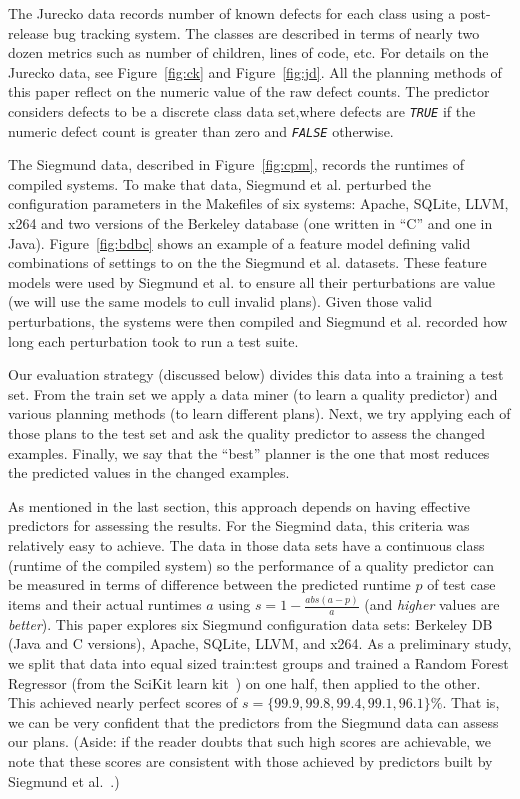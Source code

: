 \documentclass{sig-alternate}
\newcommand{\fig}[1]{Figure~\ref{fig:#1}}
\begin{document}
  
   The Jurecko data records number of known defects for each class using a post-release bug tracking system. The classes are described in terms of
  nearly two dozen metrics such as number of children, lines of code, etc. For details on the Jurecko data, see  \fig{ck} and \fig{jd}. 
 All the planning methods of this paper reflect on the numeric value of the raw defect counts. The predictor considers defects to be a discrete class data set,where defects are \textit{\texttt{TRUE}} if the numeric defect count is greater than zero and \textit{\texttt{FALSE}} otherwise.

  The Siegmund data, described in \fig{cpm},  records  the runtimes of compiled systems. To make that data, Siegmund et al. perturbed
  the configuration parameters in the Makefiles of six systems: Apache, SQLite, LLVM, x264 and two versions of the
  Berkeley database (one written in ``C'' and one in Java). 
   \fig{bdbc} shows an example of a feature model defining valid combinations of settings to on the
   the Siegmund et al. datasets. These feature models were used by Siegmund et al. to ensure all their perturbations are value
   (we will use the same models to cull invalid plans).
  Given those valid perturbations, the systems were then compiled and 
  Siegmund et al. recorded how long each perturbation took to run a test suite. 
  
  


  Our evaluation strategy (discussed below) divides this data into a training a test set.
  From the train set we apply a data miner (to learn a quality predictor) and
  various planning methods (to learn different plans). Next, we try applying
  each of those plans to the  test set and ask the quality predictor to assess the changed examples.
  Finally, we say that the  ``best'' planner is the one that most reduces the predicted values
  in the changed examples.
  
  As mentioned in the last section,  this approach depends on having effective predictors for assessing the results.
  For the Siegmind data, this criteria was   relatively easy to achieve.
  The data in those data sets have a continuous class (runtime of the compiled system)
  so the performance of a quality predictor can  be measured in terms of  difference between the predicted runtime $p$ of test case items and their actual runtimes $a$ using  $s= 1 - \frac{abs(a - p)}{a}$ (and {\em higher} values are {\em better}).
This paper  explores six Siegmund configuration data sets:  Berkeley DB (Java and C versions), Apache, SQLite, LLVM, and
  x264. 
  As a preliminary study, we split that data   into equal sized train:test groups
  and trained a Random Forest
  Regressor (from the SciKit learn kit~\cite{Pedregosa2012})   on one half, then applied to the other. This  achieved nearly perfect scores of $s=\{99.9, 99.8, 99.4, 99.1, 96.1\}\%$.
That is, we can be very confident that the predictors from the Siegmund data can assess
our plans. (Aside: if the reader doubts that such high scores are achievable, we note that these scores are consistent with those achieved by predictors built by Siegmund et al.~\cite{sven12}.)
\end{document}
